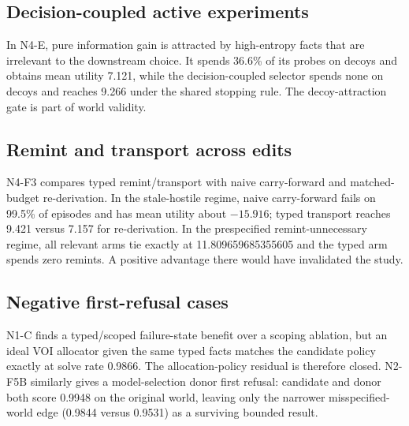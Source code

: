 \subsection{Decision-coupled active experiments}
In N4-E, pure information gain is attracted by high-entropy facts that are irrelevant to the downstream choice. It spends 36.6\% of its probes on decoys and obtains mean utility 7.121, while the decision-coupled selector spends none on decoys and reaches 9.266 under the shared stopping rule. The decoy-attraction gate is part of world validity.

\subsection{Remint and transport across edits}
N4-F3 compares typed remint/transport with naive carry-forward and matched-budget re-derivation. In the stale-hostile regime, naive carry-forward fails on 99.5\% of episodes and has mean utility about $-15.916$; typed transport reaches 9.421 versus 7.157 for re-derivation. In the prespecified remint-unnecessary regime, all relevant arms tie exactly at 11.809659685355605 and the typed arm spends zero remints. A positive advantage there would have invalidated the study.

\subsection{Negative first-refusal cases}
N1-C finds a typed/scoped failure-state benefit over a scoping ablation, but an ideal VOI allocator given the same typed facts matches the candidate policy exactly at solve rate 0.9866. The allocation-policy residual is therefore closed. N2-F5B similarly gives a model-selection donor first refusal: candidate and donor both score 0.9948 on the original world, leaving only the narrower misspecified-world edge (0.9844 versus 0.9531) as a surviving bounded result.